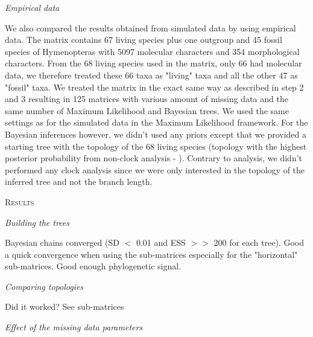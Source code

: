 \documentclass[12pt,letterpaper]{article}
\renewcommand{\section}[1]{%
\bigskip
\begin{center}
\begin{Large}
\normalfont\scshape #1
\medskip
\end{Large}
\end{center}}
\renewcommand{\subsection}[1]{%
\bigskip
\begin{center}
\begin{large}
\normalfont\itshape #1
\end{large}
\end{center}}
\begin{document}
\subsection{Empirical data} %
We also compared the results obtained from simulated data by using \citet{ronquista2012} empirical data.
The matrix contains 67 living species plus one outgroup and 45 fossil species of Hymenopteras with 5097 molecular characters and 354 morphological characters.
From the 68 living species used in the matrix, only 66 had molecular data, we therefore treated these 66 taxa as "living" taxa and all the other 47 as "fossil" taxa.
We treated the matrix in the exact same way as described in step 2 and 3 resulting in 125 matrices with various amount of missing data and the same number of Maximum Likelihood and Bayesian trees.
We used the same settings as for the simulated data in the Maximum Likelihood framework.
For the Bayesian inferences however, we didn’t used any priors except that we provided a starting tree with the topology of the 68 living species (topology with the highest posterior probability from non-clock analysis - \citet{ronquista2012}).
Contrary to \citet{ronquista2012} analysis, we didn’t performed any clock analysis since we were only interested in the topology of the inferred tree and not the branch length.


%
%


\section{Results}
\subsection{Building the trees}
Bayesian chains converged (SD $<$ 0.01 and ESS $>>$ 200 for each tree).
Good a quick convergence when using the sub-matrices especially for the "horizontal" sub-matrices.
Good enough phylogenetic signal.
\subsection{Comparing topologies}
Did it worked? See sub-matrices

\subsection{Effect of the missing data parameters}
\end{document}
